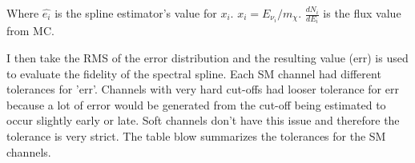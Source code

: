 Where $ \hat{e_i} $ is the spline estimator's value for $x_i$. $ x_i = E_{\nu_i} / m_\chi $. $ \frac{dN_i}{dE_i} $ is the flux value from MC.
\MSEspline

I then take the RMS of the error distribution and the resulting value (err) is used to evaluate the fidelity of the spectral spline.
Each SM channel had different tolerances for 'err'. Channels with very hard cut-offs had looser tolerance for err because a lot of error would be generated from the cut-off being estimated to occur slightly early or late.
Soft channels don't have this issue and therefore the tolerance is very strict.
The table blow summarizes the tolerances for the SM channels.
%
%
%
%
%
